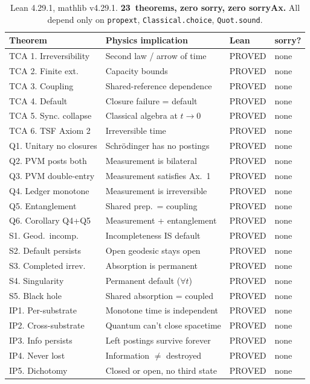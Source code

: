 \documentclass[11pt]{article}
\theoremstyle{definition}
\theoremstyle{remark}
\begin{document}
\begin{table}[h]
\centering
\begin{tabular}{@{}llll@{}}
\toprule
\textbf{Theorem} & \textbf{Physics implication} & \textbf{Lean} & \textbf{sorry?} \\
\midrule
TCA 1. Irreversibility & Second law / arrow of time & PROVED & none \\
TCA 2. Finite ext. & Capacity bounds & PROVED & none \\
TCA 3. Coupling & Shared-reference dependence & PROVED & none \\
TCA 4. Default & Closure failure = default & PROVED & none \\
TCA 5. Sync. collapse & Classical algebra at $t\to 0$ & PROVED & none \\
TCA 6. TSF Axiom 2 & Irreversible time & PROVED & none \\
\midrule
Q1. Unitary no closures & Schr\"odinger has no postings & PROVED & none \\
Q2. PVM posts both & Measurement is bilateral & PROVED & none \\
Q3. PVM double-entry & Measurement satisfies Ax.~1 & PROVED & none \\
Q4. Ledger monotone & Measurement is irreversible & PROVED & none \\
Q5. Entanglement & Shared prep.\ = coupling & PROVED & none \\
Q6. Corollary Q4+Q5 & Measurement + entanglement & PROVED & none \\
\midrule
S1. Geod.\ incomp. & Incompleteness IS default & PROVED & none \\
S2. Default persists & Open geodesic stays open & PROVED & none \\
S3. Completed irrev. & Absorption is permanent & PROVED & none \\
S4. Singularity & Permanent default ($\forall t$) & PROVED & none \\
S5. Black hole & Shared absorption = coupled & PROVED & none \\
\midrule
IP1. Per-substrate & Monotone time is independent & PROVED & none \\
IP2. Cross-substrate & Quantum can't close spacetime & PROVED & none \\
IP3. Info persists & Left postings survive forever & PROVED & none \\
IP4. Never lost & Information $\neq$ destroyed & PROVED & none \\
IP5. Dichotomy & Closed or open, no third state & PROVED & none \\
\bottomrule
\end{tabular}
\caption{Lean 4.29.1, mathlib v4.29.1.  \textbf{23~theorems, zero sorry,
zero sorryAx.}  All depend only on \texttt{propext},
\texttt{Classical.choice}, \texttt{Quot.sound}.}
\end{table}
\end{document}
